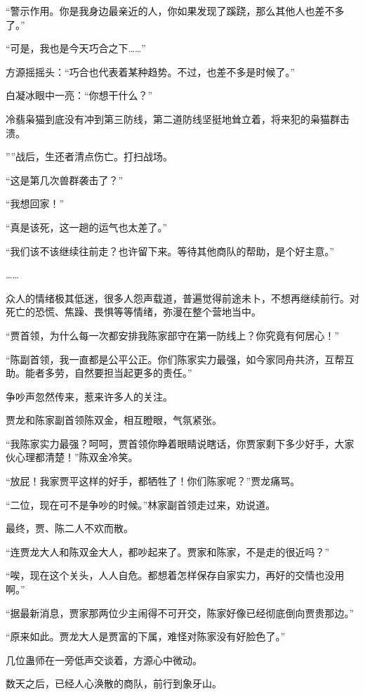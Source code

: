 \begin{this_body}
“警示作用。你是我身边最亲近的人，你如果发现了蹊跷，那么其他人也差不多了。”

“可是，我也是今天巧合之下……”

方源摇摇头：“巧合也代表着某种趋势。不过，也差不多是时候了。”

白凝冰眼中一亮：“你想干什么？”

冷翡枭猫到底没有冲到第三防线，第二道防线坚挺地耸立着，将来犯的枭猫群击溃。

””战后，生还者清点伤亡。打扫战场。

“这是第几次兽群袭击了？”

“我想回家！”

“真是该死，这一趟的运气也太差了。”

“我们该不该继续往前走？也许留下来。等待其他商队的帮助，是个好主意。”

……

众人的情绪极其低迷，很多人怨声载道，普遍觉得前途未卜，不想再继续前行。对死亡的恐慌、焦躁、畏惧等等情绪，弥漫在整个营地当中。

“贾首领，为什么每一次都安排我陈家部守在第一防线上？你究竟有何居心！”

“陈副首领，我一直都是公平公正。你们陈家实力最强，如今家同舟共济，互帮互助。能者多劳，自然要担当起更多的责任。”

争吵声忽然传来，惹来许多人的关注。

贾龙和陈家副首领陈双金，相互瞪眼，气氛紧张。

“我陈家实力最强？呵呵，贾首领你睁着眼睛说瞎话，你贾家剩下多少好手，大家伙心理都清楚！”陈双金冷笑。

“放屁！我家贾平这样的好手，都牺牲了！你们陈家呢？”贾龙痛骂。

“二位，现在可不是争吵的时候。”林家副首领走过来，劝说道。

最终，贾、陈二人不欢而散。

“连贾龙大人和陈双金大人，都吵起来了。贾家和陈家，不是走的很近吗？”

“唉，现在这个关头，人人自危。都想着怎样保存自家实力，再好的交情也没用啊。”

“据最新消息，贾家那两位少主闹得不可开交，陈家好像已经彻底倒向贾贵那边。”

“原来如此。贾龙大人是贾富的下属，难怪对陈家没有好脸色了。”

几位蛊师在一旁低声交谈着，方源心中微动。

数天之后，已经人心涣散的商队，前行到象牙山。


\end{this_body}
